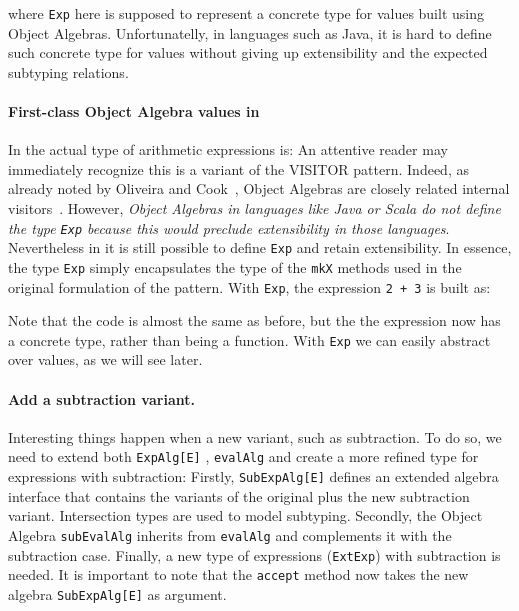 \noindent where \lstinline{Exp} here is supposed to represent a
concrete type for values built using Object Algebras. Unfortunatelly, in languages
such as Java, it is hard to define such concrete type for values
without giving up extensibility and the expected subtyping  relations.

\paragraph{First-class Object Algebra values in \name}
In \name the actual type of arithmetic expressions is:
An attentive reader may immediately recognize this is a variant of the VISITOR
pattern. Indeed, as already noted by Oliveira and Cook~\cite{}, Object
Algebras are closely related internal visitors~\cite{}. However, \emph{Object
Algebras in languages like Java or Scala do not define the type
\lstinline{Exp} because this would preclude extensibility in those
languages}. Nevertheless in \name it is still possible to define
\lstinline{Exp} and retain extensibility. In essence, the type
\lstinline{Exp} simply encapsulates the type 
of the \lstinline{mkX} methods used in the original formulation of the
pattern. With \lstinline{Exp}, the expression \lstinline{2 + 3} is
built as:


\noindent Note that the code is almost the same as before, but the the
expression now has a concrete type, rather than being a function. With
\lstinline{Exp} we can easily abstract over values, as we will see later.



\paragraph{Add a subtraction variant.} Interesting things happen when a new
variant, such as subtraction. To do so, we need to extend both
\lstinline{ExpAlg[E]} , \lstinline{evalAlg} and create a more refined
type for expressions with subtraction:
Firstly, \lstinline{SubExpAlg[E]} defines an extended algebra interface that contains the
variants of the original plus the new subtraction variant. Intersection types
are used to model subtyping. Secondly, the Object Algebra
\lstinline{subEvalAlg} inherits from \lstinline{evalAlg} and
complements it with the subtraction case.
Finally, a new type of expressions
(\lstinline{ExtExp}) with subtraction is needed. It is important to note that
the \lstinline{accept} method now takes the new algebra \lstinline{SubExpAlg[E]}
as argument.

